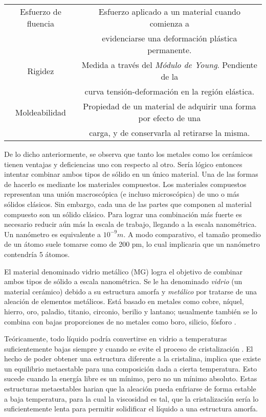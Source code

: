 \begin{table}[htp]
\begin{center}
\begin{tabular}{*{2}{c}}
Esfuerzo de fluencia & 
Esfuerzo aplicado a un material cuando comienza a\\
& evidenciarse una deformación plástica permanente.\\ \hline

Rigidez & 
Medida a través del \textit{Módulo de Young}. Pendiente de la \\
& curva tensión-deformación en la región elástica. \\ \hline

Moldeabilidad &
Propiedad de un material de adquirir una forma por efecto de una\\
& carga, y de conservarla al retirarse la misma. \\ \hline

\end{tabular}
\end{center}
\label{C1:tbl:propiedades}
\end{table}

De lo dicho anteriormente, se observa que tanto los metales como los cerámicos tienen ventajas y deficiencias uno con respecto al otro. Sería lógico entonces intentar combinar ambos tipos de sólido en un único material. Una de las formas de hacerlo es mediante los materiales compuestos. Los materiales compuestos representan una unión macroscópica (e incluso microscópica) de uno o más sólidos clásicos. Sin embargo, cada una de las partes que componen al material compuesto son un sólido clásico. Para lograr una combinación más fuerte es necesario reducir aún más la escala de trabajo, llegando a la escala nanométrica. Un nanómetro es equivalente a $10^{-9} m$. A modo comparativo, el tamaño promedio de un átomo suele tomarse como de 200 pm, lo cual implicaria que un nanómetro contendría 5 átomos.

El material denominado vidrio metálico (MG) logra el objetivo de combinar ambos tipos de sólido a escala nanométrica. Se le ha denominado \textit{vidrio} (un material cerámico) debido a su estructura amorfa y \textit{metálico} por tratarse de una aleación de elementos metálicos. Está basado en metales como cobre, níquel, hierro, oro, paladio, titanio, circonio, berilio y lantano; usualmente también se lo combina con bajas proporciones de no metales como boro, silicio, fósforo \citep{andrievski13}.

Teóricamente, todo líquido podría convertirse en vidrio a temperaturas suficientemente bajas siempre y cuando se evite el proceso de cristalización \citep{turnbull61}. El hecho de poder obtener una estructura diferente a la cristalina, implica que existe un equilibrio metaestable para una composición dada a cierta temperatura. Esto sucede cuando la energía libre es un mínimo, pero no un mínimo absoluto. Estas estructuras metaestables harian que la aleación pueda enfriarse de forma estable a baja temperatura, para la cual la viscosidad es tal, que la cristalización sería lo suficientemente lenta para permitir solidificar el líquido a una estructura amorfa.

